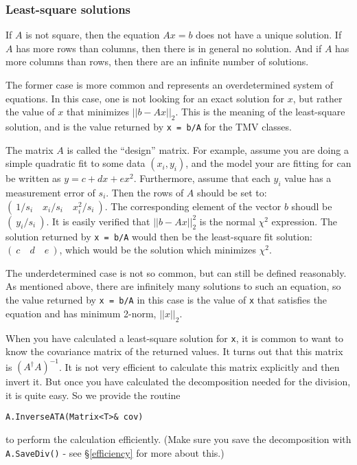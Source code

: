 \documentclass[twoside,letterpaper,11pt]{article}
\renewcommand{\tt}[1]{{\texttt {#1}}}
\begin{document}
\subsubsection{Least-square solutions}
\label{leastsquare}

If $A$ is not square, then the equation $A x = b$ does not have a unique solution.
If $A$ has more rows than columns, then there is in general no solution.
And if $A$ has more columns than rows, then there are an infinite 
number of solutions.  

The former case is more common and represents an overdetermined system of 
equations.  In this case, one is not looking for an exact solution
for $x$, but rather the value of $x$ that minimizes $||b - A x||_2$.  This is the 
meaning of the least-square
solution, and is the value returned by \tt{x = b/A} for the TMV classes.  

The matrix $A$ is called the ``design'' matrix.  For example, assume you are doing
a simple quadratic fit to some data $(x_i,y_i)$, and the model your are fitting for
can be written as
$y = c + dx + ex^2$.  Furthermore, assume that each
$y_i$ value has a measurement error of $s_i$.  Then the rows of $A$ should
be set to: $( ~1/s_i \quad x_i/s_i \quad x_i^2/s_i ~ )$.  The corresponding
element of the vector $b$ shoudl be $( ~ y_i/s_i ~ )$.  It is easily verified that
$||b-Ax||_2^2$ is the normal $\chi^2$ expression.
The solution returned by
\tt{x = b/A} would then be the least-square fit solution: $(~c \quad d \quad e~)$,
which would be the solution which minimizes $\chi^2$.

The underdetermined case is not so common, but can still be defined reasonably.  
As mentioned above, there are infinitely many solutions to such an equation, so the
value returned by \tt{x = b/A} in this case is the value of \tt{x} that satisfies the 
equation and has minimum 2-norm, $||x||_2$.

When you have calculated a least-square solution for \tt{x}, it is common to want 
to know the covariance matrix of the returned values.  It turns out that this
matrix is $(A^\dagger A)^{-1}$.  It is not very efficient to calculate this matrix
explicitly and then invert it.  But once you have calculated the decomposition
needed for the division, it is quite easy.  So we provide the routine 
\begin{verbatim}
A.InverseATA(Matrix<T>& cov)
\end{verbatim}
to perform the calculation efficiently.  (Make sure you save the decomposition with 
\tt{A.SaveDiv()} - see \S\ref{efficiency} for more about this.)
\end{document}
